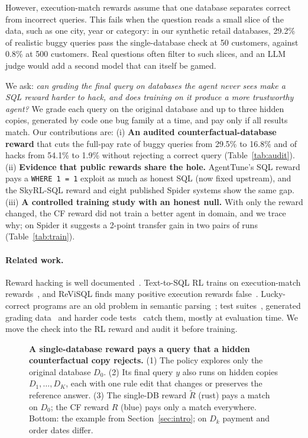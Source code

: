 \documentclass{article}
\begin{document}
However, execution-match rewards assume that one database separates correct from incorrect queries. This fails when the question reads a small slice of the data, such as one city, year or category: in our synthetic retail databases, 29.2\% of realistic buggy queries pass the single-database check at 50 customers, against 0.8\% at 500 customers. %
Real questions often filter to such slices, and an LLM judge would add a second model that can itself be gamed.

We ask: \emph{can grading the final query on databases the agent never sees make a SQL reward harder to hack, and does training on it produce a more trustworthy agent?} We grade each query on the original database and up to three hidden copies, generated by code one bug family at a time, and pay only if all results match. Our contributions are:
(i) \textbf{An audited counterfactual-database reward} that cuts the full-pay rate of buggy queries from 29.5\% to 16.8\% and of hacks from 54.1\% to 1.9\% without rejecting a correct query (Table~\ref{tab:audit}).
(ii) \textbf{Evidence that public rewards share the hole.} AgentTune's SQL reward pays a \texttt{WHERE 1 = 1} exploit as much as honest SQL (now fixed upstream), and the SkyRL-SQL reward and eight published Spider systems show the same gap.
(iii) \textbf{A controlled training study with an honest null.} With only the reward changed, the CF reward did not train a better agent in domain, and we trace why; on Spider it suggests a 2-point transfer gain in two pairs of runs (Table~\ref{tab:train}).

\paragraph{Related work.}
Reward hacking is well documented~\citep{amodei2016,skalse2022,gao2023}. Text-to-SQL RL trains on execution-match rewards~\citep{ma2025sqlr1,pourreza2025,yao2025arctic}, and ReViSQL finds many positive execution rewards false~\citep{zhu2026revisql}. Lucky-correct programs are an old problem in semantic parsing~\citep{pasupat2016}; test suites~\citep{zhong2020}, generated grading data~\citep{chandra2014,habibollah2026} and harder code tests~\citep{he2025hardtests} catch them, mostly at evaluation time. We move the check into the RL reward and audit it before training.

\begin{figure}[t]
  \centering
  
  \caption{\textbf{A single-database reward pays a query that a hidden counterfactual copy rejects.} (1) The policy explores only the original database $D_0$. (2) Its final query $y$ also runs on hidden copies $D_1,\dots,D_K$, each with one rule edit that changes or preserves the reference answer. (3) The single-DB reward $\tilde R$ (rust) pays a match on $D_0$; the CF reward $R$ (blue) pays only a match everywhere. Bottom: the example from Section~\ref{sec:intro}; on $D_k$ payment and order dates differ.}
  \label{fig:pipeline}
\end{figure}
\end{document}

